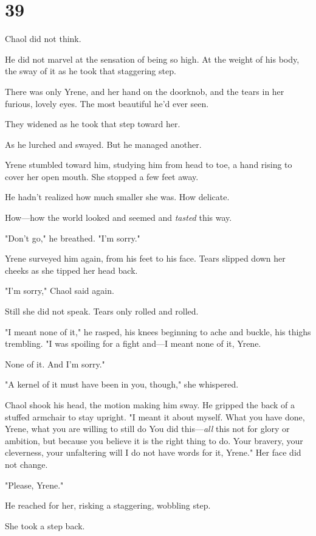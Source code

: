 
\chapter{39}

Chaol did not think.

He did not marvel at the sensation of being so high. At the weight of his body, the sway of it as he took that staggering step.

There was only Yrene, and her hand on the doorknob, and the tears in her furious, lovely eyes. The most beautiful he'd ever seen.

They widened as he took that step toward her.

As he lurched and swayed. But he managed another.

Yrene stumbled toward him, studying him from head to toe, a hand rising to cover her open mouth. She stopped a few feet away.

He hadn't realized how much smaller she was. How delicate.

How---how the world looked and seemed and \emph{tasted} this way.

"Don't go," he breathed. "I'm sorry."

Yrene surveyed him again, from his feet to his face. Tears slipped down her cheeks as she tipped her head back.

"I'm sorry," Chaol said again.

Still she did not speak. Tears only rolled and rolled.

"I meant none of it," he rasped, his knees beginning to ache and buckle, his thighs trembling. "I was spoiling for a fight and---I meant none of it, Yrene.

None of it. And I'm sorry."

"A kernel of it must have been in you, though," she whispered.

Chaol shook his head, the motion making him sway. He gripped the back of a stuffed armchair to stay upright. "I meant it about myself. What you have done, Yrene, what you are willing to still do  You did this---\emph{all} this not for glory or ambition, but because you believe it is the right thing to do. Your bravery, your cleverness, your unfaltering will  I do not have words for it, Yrene." Her face did not change.

"Please, Yrene."

He reached for her, risking a staggering, wobbling step.

She took a step back.

